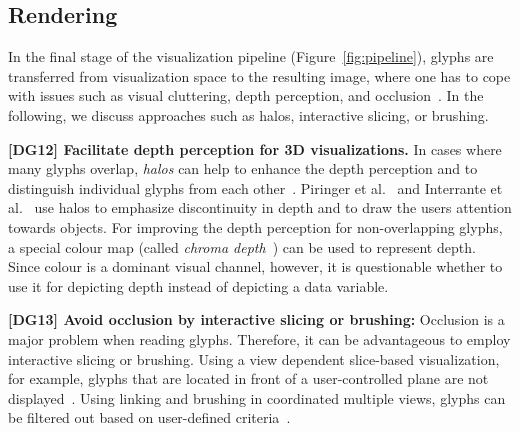 


\subsection{Rendering}
\label{sec:rendering}

In the final stage of the visualization pipeline (Figure~\ref{fig:pipeline}), glyphs are transferred from visualization space to the resulting image, where one has to cope with issues such as visual cluttering, depth perception, and occlusion~\cite{lie09glyphs}.
In the following, we discuss approaches such as halos, interactive slicing, or brushing.

\textbf{[DG12] Facilitate depth perception for 3D visualizations.}
In cases where many glyphs overlap, \emph{halos} can help to enhance the depth perception and to distinguish individual glyphs from each other~\cite{lie09glyphs}.
Piringer et al.~\cite{piringer04scatterplots} and Interrante et al.~\cite{interranteGrosch98flow} use halos to emphasize discontinuity in depth and to draw the users attention towards objects.
For improving the depth perception for non-overlapping glyphs, a special colour map (called \emph{chroma depth}~\cite{toutin97chromaDepth}) can be used to represent depth.
Since colour is a dominant visual channel, however, it is questionable whether to use it for depicting depth instead of depicting a data variable.


\textbf{[DG13] Avoid occlusion by interactive slicing or brushing:}
Occlusion is a major problem when reading glyphs. Therefore, it can be advantageous to employ interactive slicing or brushing.
Using a view dependent slice-based visualization, for example, glyphs that are located in front of a user-controlled plane are not displayed~\cite{lie09glyphs}.
Using linking and brushing in coordinated multiple views,
glyphs can be filtered out based on user-defined criteria~\cite{kehrer11interface}.

